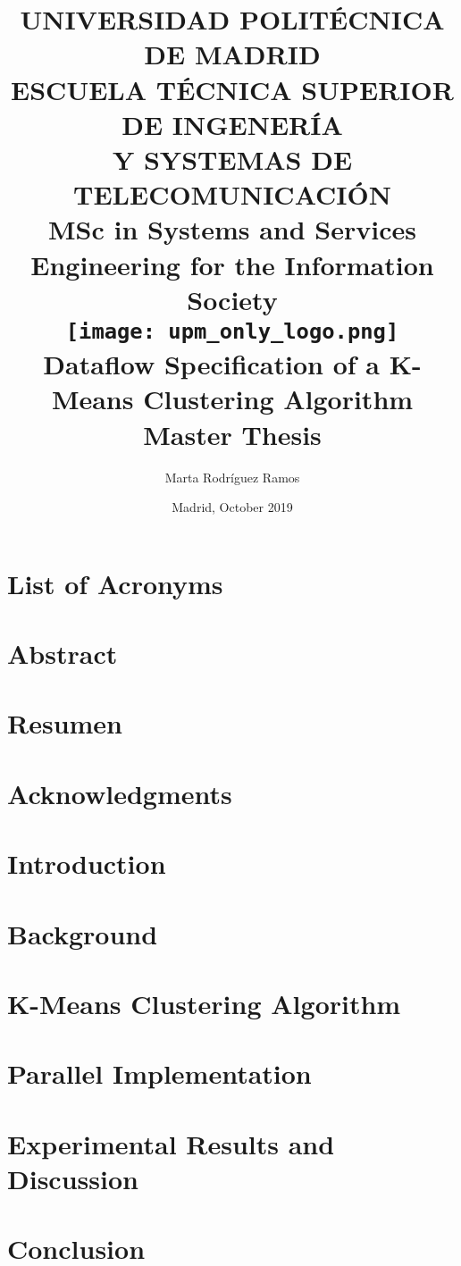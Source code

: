 \documentclass[11pt, a4paper, oneside]{report}
\title{{\LARGE UNIVERSIDAD POLITÉCNICA\\ DE MADRID}\\
\vskip 5mm
{\large \textbf{ESCUELA TÉCNICA SUPERIOR DE INGENERÍA\\
Y SYSTEMAS DE TELECOMUNICACIÓN}}\\
\vskip 5mm
{\large MSc in Systems and Services Engineering for the Information Society}\\
\vskip 10mm
{\texttt{[image: upm\_only\_logo.png]}}\\
\vskip 5mm
{\textbf{Dataflow Specification of a K-Means Clustering Algorithm}}\\
\vskip 10mm
{Master Thesis}}
\author{Marta Rodríguez Ramos}
\date{Madrid, October 2019}
\begin{document}

\sloppy
\maketitle\thispagestyle{empty}
\tableofcontents
\listoffigures
\listoftables
\chapter*{List of Acronyms}
	
\onehalfspacing
{}
\justify
\chapter*{Abstract}
	
\chapter*{Resumen}
	
\chapter*{Acknowledgments}
	
\chapter{Introduction}
	
\chapter{Background}
	\label{sec:background}
	
\chapter{K-Means Clustering Algorithm}
	\label{sec:kmeans_algorithm}
	
\chapter{Parallel Implementation}
	\label{sec:parallel_implementation}
	
\chapter{Experimental Results and Discussion}
	\label{sec:results}
	
\chapter{Conclusion}
	\label{sec:conclusion}
	

\printbibliography
%
%
\end{document}

